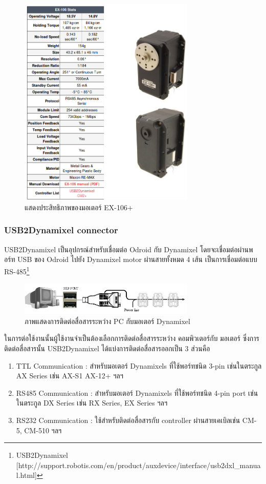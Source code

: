 \begin{figure}[ht]
    \centering
    \includegraphics[width=0.75\textwidth]{chapter3/images/dxl_ex106.png}
    \caption{แสดงประสิทธิภาพของมอเตอร์ EX-106+}
    \label{fig:dxl_ex106}
\end{figure}

\clearpage


\subsubsection*{USB2Dynamixel connector}
USB2Dynamixel เป็นอุปกรณ์สำหรับเชื่อมต่อ Odroid กับ Dynamixel โดยจะเชื่อมต่อผ่านพอร์ท USB ของ Odroid ไปยัง Dynamixel motor
ผ่านสายทั้งหมด 4 เส้น เป็นการเชื่อมต่อแบบ RS-485\footnote{USB2Dynamixel [http://support.robotis.com/en/product/auxdevice/interface/usb2dxl\_manual.html]}

\begin{figure}[ht]
    \centering
    \includegraphics[width=0.75\textwidth]{chapter3/images/dynamixel2pc.png}
    \caption{ภาพแสดงการติดต่อสื่อสารระหว่าง PC กับมอเตอร์ Dynamixel}
    \label{fig:dynamixel2pc}
\end{figure}


ในการต่อใช้งานนั้นผู้ใช้งานจำเป็นต้องเลือกการติดต่อสื่อสารระหว่าง คอมพิวเตอร์กับ มอเตอร์ ซึ่งการติดต่อสื่อสารนั้น
USB2Dynamixel ได้แบ่งการติดต่อสื่อสารออกเป็น 3 ส่วนคือ
\begin{enumerate}
    \item TTL Communication : สำหรับมอเตอร์ Dynamixels ที่ใช้พอร์ทชนิด 3-pin เช่นในตระกูล AX Series เช่น AX-S1 AX-12+ ฯลฯ
    \item  RS485 Communication : สำหรับมอเตอร์ Dynamixels ที่ใช้พอร์ทชนิด 4-pin port เช่นในตระกูล DX Series เช่น RX Series, EX Series ฯลฯ
    \item RS232 Communication : ใช้สำหรับติดต่อสื่อสารกับ controller ผ่านสายเคเบิลเช่น CM-5, CM-510 ฯลฯ
\end{enumerate}

